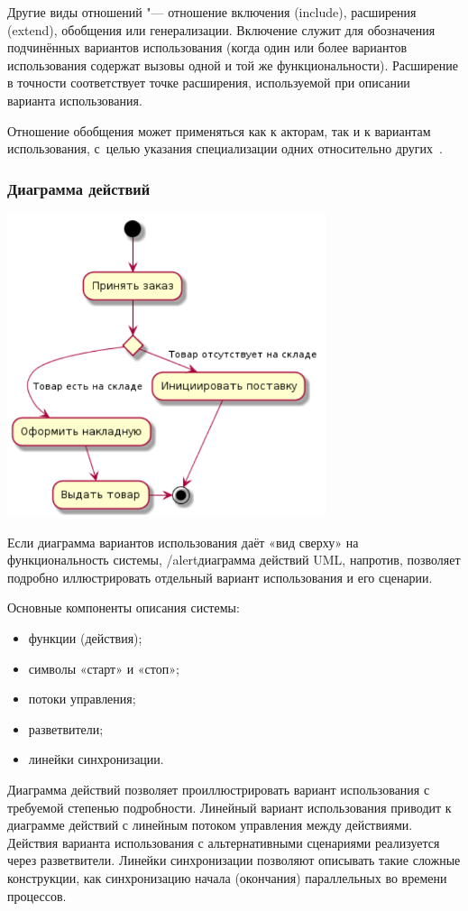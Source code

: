 \documentclass{../industrial-development}
\begin{document}
Другие виды отношений "--- отношение включения (include), расширения (extend), обобщения или генерализации. Включение служит для обозначения подчинённых вариантов использования (когда один или более вариантов использования содержат вызовы одной и той же функциональности). Расширение в точности соответствует точке расширения, используемой при описании варианта использования.

Отношение обобщения может применяться как к акторам, так и к вариантам использования, с~целью указания специализации одних относительно других~\cite[с.~46]{Maglinec}.


\begin{frame} \frametitle {Диаграмма действий}
 \centerline{\includegraphics[width=0.7\textwidth]{pictactivityd.pdf}}
\end{frame}

\lecturenotes

Если диаграмма вариантов использования даёт «вид сверху» на функциональность системы, /alert{диаграмма действий UML}, напротив, позволяет подробно иллюстрировать отдельный вариант использования и его сценарии.

Основные компоненты описания системы:
\begin{itemize}
\item функции (действия);
\item символы «старт» и «стоп»;
\item потоки управления;
\item разветвители;
\item линейки синхронизации.
\end{itemize}

Диаграмма действий позволяет проиллюстрировать вариант использования с требуемой степенью подробности. Линейный вариант использования приводит к диаграмме действий с линейным потоком управления между действиями. Действия варианта использования с альтернативными сценариями реализуется через разветвители. Линейки синхронизации позволяют описывать такие сложные конструкции, как синхронизацию начала (окончания) параллельных во времени процессов.
\end{document}
